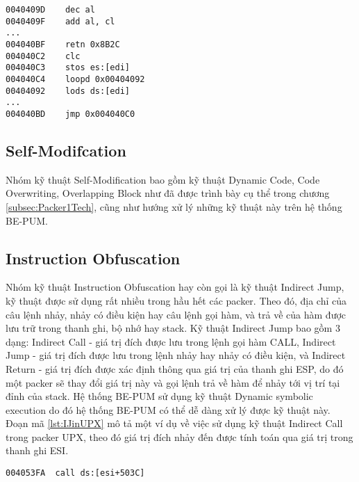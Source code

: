 \begin{enumerate}
{\begin{itemize}
{\begin{code}
\begin{lstlisting}[captionpos=b,caption={Kỹ thuật Overlapping Block sử dụng trong packer YODA},label={lst:OBinYODA},frame=single]
0040409D	dec al
0040409F	add al, cl
...
004040BF	retn 0x8B2C		
004040C2	clc
004040C3	stos es:[edi]
004040C4	loopd 0x00404092
00404092	lods ds:[edi]
...		
004040BD	jmp 0x004040C0
\end{lstlisting}
\end{code}
}
\end{itemize}
}
\end{enumerate}

\subsection{Self-Modifcation}
\hspace{0.5cm}Nhóm kỹ thuật Self-Modification bao gồm kỹ thuật Dynamic Code, Code Overwriting, Overlapping Block như đã được trình bày cụ thể trong chương \ref {subsec:Packer1Tech}, cũng như hướng xử lý những kỹ thuật này trên hệ thống BE-PUM.

\subsection{Instruction Obfuscation}
\hspace{0.5cm}Nhóm kỹ thuật Instruction Obfuscation hay còn gọi là kỹ thuật Indirect Jump, kỹ thuật được sử dụng rất nhiều trong hầu hết các packer. Theo đó, địa chỉ của câu lệnh nhảy, nhảy có điều kiện hay câu lệnh gọi hàm, và trả về của hàm được lưu trữ trong thanh ghi, bộ nhớ hay stack. Kỹ thuật Indirect Jump bao gồm 3 dạng: Indirect Call - giá trị đích được lưu trong lệnh gọi hàm CALL, Indirect Jump - giá trị đích được lưu trong lệnh nhảy hay nhảy có điều kiện, và Indirect Return - giá trị đích được xác định thông qua giá trị của thanh ghi ESP, do đó một packer sẽ thay đổi giá trị này và gọi lệnh trả về hàm để nhảy tới vị trí tại đỉnh của stack. Hệ thống BE-PUM sử dụng kỹ thuật Dynamic symbolic execution do đó hệ thống BE-PUM có thể dễ dàng xử lý được kỹ thuật này. Đoạn mã \ref {lst:IJinUPX} mô tả một ví dụ về việc sử dụng kỹ thuật Indirect Call trong packer UPX, theo đó giá trị đích nhảy đến được tính toán qua giá trị trong thanh ghi ESI.
\begin{code}
\begin{lstlisting}[captionpos=b,caption={Kỹ thuật Indirect Jump sử dụng trong packer UPX},label={lst:IJinUPX},frame=single]
004053FA  call ds:[esi+503C]
\end{lstlisting}
\end{code}

